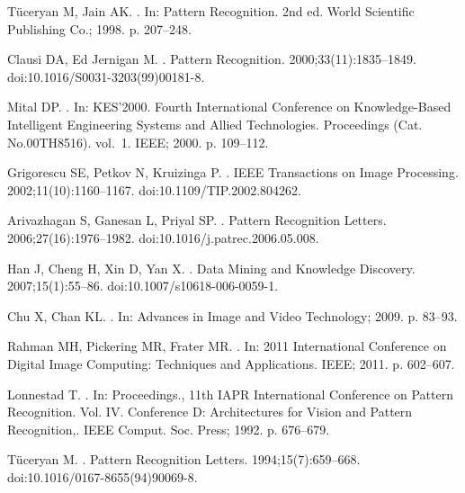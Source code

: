 \documentclass[10pt,letterpaper]{article}
\begin{document}
\begin{thebibliography}{10}
T{\"{u}}ceryan M, Jain AK.
.
\newblock In: Pattern Recognition. 2nd ed. World Scientific Publishing Co.;
  1998. p. 207--248.

Clausi DA, {Ed Jernigan} M.
.
\newblock Pattern Recognition. 2000;33(11):1835--1849.
\newblock doi:{10.1016/S0031-3203(99)00181-8}.

Mital DP.
.
\newblock In: KES'2000. Fourth International Conference on Knowledge-Based
  Intelligent Engineering Systems and Allied Technologies. Proceedings (Cat.
  No.00TH8516). vol.~1. IEEE; 2000. p. 109--112.

Grigorescu SE, Petkov N, Kruizinga P.
.
\newblock IEEE Transactions on Image Processing. 2002;11(10):1160--1167.
\newblock doi:{10.1109/TIP.2002.804262}.

Arivazhagan S, Ganesan L, Priyal SP.
.
\newblock Pattern Recognition Letters. 2006;27(16):1976--1982.
\newblock doi:{10.1016/j.patrec.2006.05.008}.

Han J, Cheng H, Xin D, Yan X.
.
\newblock Data Mining and Knowledge Discovery. 2007;15(1):55--86.
\newblock doi:{10.1007/s10618-006-0059-1}.

Chu X, Chan KL.
.
\newblock In: Advances in Image and Video Technology; 2009. p. 83--93.

Rahman MH, Pickering MR, Frater MR.
.
\newblock In: 2011 International Conference on Digital Image Computing:
  Techniques and Applications. IEEE; 2011. p. 602--607.

Lonnestad T.
.
\newblock In: Proceedings., 11th IAPR International Conference on Pattern
  Recognition. Vol. IV. Conference D: Architectures for Vision and Pattern
  Recognition,. IEEE Comput. Soc. Press; 1992. p. 676--679.

T{\"{u}}ceryan M.
.
\newblock Pattern Recognition Letters. 1994;15(7):659--668.
\newblock doi:{10.1016/0167-8655(94)90069-8}.


\end{thebibliography}
\end{document}
